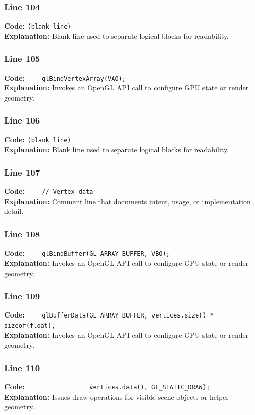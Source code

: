 \documentclass[11pt,a4paper]{article}
\begin{document}
\subsubsection*{Line 104}
\textbf{Code:} \texttt{(blank line)}\\
\textbf{Explanation:} Blank line used to separate logical blocks for readability.

\subsubsection*{Line 105}
\textbf{Code:} \verb|    glBindVertexArray(VAO);|\\
\textbf{Explanation:} Invokes an OpenGL API call to configure GPU state or render geometry.

\subsubsection*{Line 106}
\textbf{Code:} \texttt{(blank line)}\\
\textbf{Explanation:} Blank line used to separate logical blocks for readability.

\subsubsection*{Line 107}
\textbf{Code:} \verb|    // Vertex data|\\
\textbf{Explanation:} Comment line that documents intent, usage, or implementation detail.

\subsubsection*{Line 108}
\textbf{Code:} \verb|    glBindBuffer(GL_ARRAY_BUFFER, VBO);|\\
\textbf{Explanation:} Invokes an OpenGL API call to configure GPU state or render geometry.

\subsubsection*{Line 109}
\textbf{Code:} \verb|    glBufferData(GL_ARRAY_BUFFER, vertices.size() * sizeof(float),|\\
\textbf{Explanation:} Invokes an OpenGL API call to configure GPU state or render geometry.

\subsubsection*{Line 110}
\textbf{Code:} \verb|                 vertices.data(), GL_STATIC_DRAW);|\\
\textbf{Explanation:} Issues draw operations for visible scene objects or helper geometry.
\end{document}
